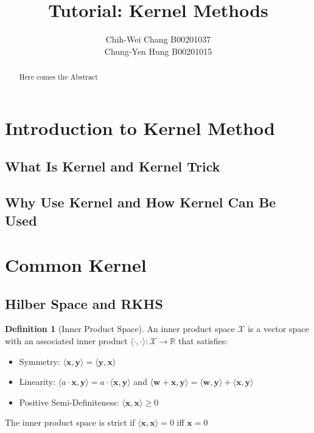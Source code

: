 \documentclass[12pt]{article}
\theoremstyle{definition}
\newtheorem{definition}{Definition}[section]
\theoremstyle{remark}
\begin{document}

\title{Tutorial: Kernel Methods}
\author{Chih-Wei Chang B00201037\\
Chung-Yen Hung B00201015}
\maketitle

\begin{abstract}
  Here comes the Abstract
\end{abstract}

\section{Introduction to Kernel Method}
\subsection{What Is Kernel and Kernel Trick}
\subsection{Why Use Kernel and How Kernel Can Be Used}

\section{Common Kernel}
\subsection{Hilber Space and RKHS}
\begin{definition}[Inner Product Space]
  An inner product space \(\mathcal{X}\) is a vector space with an associated inner product \(\langle \cdot,\cdot \rangle: \mathcal{X} \rightarrow \mathbb{R}\) that satisfies:
  \begin{itemize}
    \item Symmetry: \(\langle \mathbf{x}, \mathbf{y} \rangle = \langle \mathbf{y}, \mathbf{x} \rangle\)
    \item Linearity: \(\langle a \cdot \mathbf{x}, \mathbf{y} \rangle = a \cdot \langle \mathbf{x}, \mathbf{y} \rangle\) and \(\langle \mathbf{w} + \mathbf{x}, \mathbf{y} \rangle =  \langle \mathbf{w}, \mathbf{y} \rangle + \langle \mathbf{x}, \mathbf{y} \rangle\)
    \item Positive Semi-Definiteness: \( \langle \mathbf{x}, \mathbf{x} \rangle \geq 0 \)
  \end{itemize}
  The inner product space is strict if \( \langle \mathbf{x}, \mathbf{x} \rangle = 0 \) iff \( \mathbf{x} = 0 \)
\end{definition}
\end{document}
